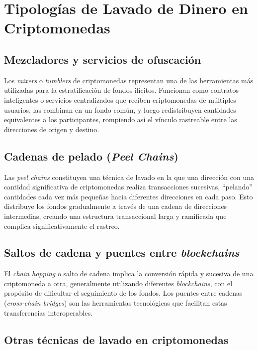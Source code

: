 \section{Tipologías de Lavado de Dinero en Criptomonedas}

\subsection{Mezcladores y servicios de ofuscación}

Los \textit{mixers} o \textit{tumblers} de criptomonedas representan una de las herramientas más utilizadas para la estratificación de fondos ilícitos. Funcionan como contratos inteligentes o servicios centralizados que reciben criptomonedas de múltiples usuarios, las combinan en un fondo común, y luego redistribuyen cantidades equivalentes a los participantes, rompiendo así el vínculo rastreable entre las direcciones de origen y destino.

\subsection{Cadenas de pelado (\textit{Peel Chains})}

Las \textit{peel chains} constituyen una técnica de lavado en la que una dirección con una cantidad significativa de criptomonedas realiza transacciones sucesivas, ``pelando'' cantidades cada vez más pequeñas hacia diferentes direcciones en cada paso. Esto distribuye los fondos gradualmente a través de una cadena de direcciones intermedias, creando una estructura transaccional larga y ramificada que complica significativamente el rastreo.

\subsection{Saltos de cadena y puentes entre \textit{blockchains}}

El \textit{chain hopping} o salto de cadena implica la conversión rápida y sucesiva de una criptomoneda a otra, generalmente utilizando diferentes \textit{blockchains}, con el propósito de dificultar el seguimiento de los fondos. Los puentes entre cadenas (\textit{cross-chain bridges}) son las herramientas tecnológicas que facilitan estas transferencias interoperables.

\subsection{Otras técnicas de lavado en criptomonedas}

